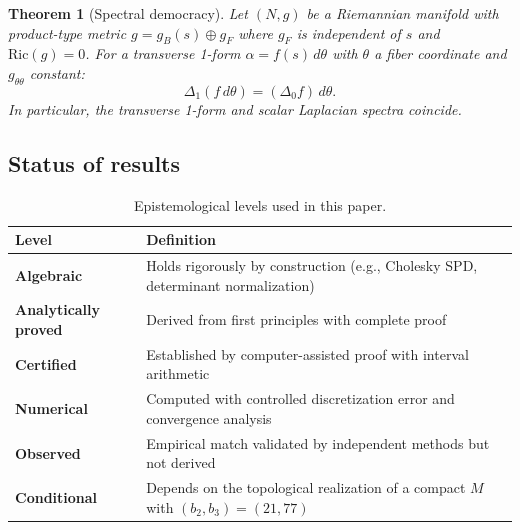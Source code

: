 \documentclass[11pt,a4paper]{article}
\newtheorem{theorem}{Theorem}[section]
\theoremstyle{definition}
\theoremstyle{remark}
\begin{document}
\begin{theorem}[Spectral democracy]\label{thm:D}
Let $(N, g)$ be a Riemannian manifold with product-type metric $g = g_B(s) \oplus g_F$ where $g_F$ is independent of $s$ and $\mathrm{Ric}(g) = 0$. For a transverse 1-form $\alpha = f(s)\,d\theta$ with $\theta$ a fiber coordinate and $g_{\theta\theta}$ constant:
\[
\Delta_1(f\, d\theta) = (\Delta_0 f)\, d\theta.
\]
In particular, the transverse 1-form and scalar Laplacian spectra coincide.
\end{theorem}

\subsection{Status of results}

\begin{table}[ht]
\centering
\begin{tabular}{ll}
\toprule
Level & Definition \\
\midrule
\textbf{Algebraic} & Holds rigorously by construction (e.g., Cholesky SPD, determinant normalization) \\
\textbf{Analytically proved} & Derived from first principles with complete proof \\
\textbf{Certified} & Established by computer-assisted proof with interval arithmetic \\
\textbf{Numerical} & Computed with controlled discretization error and convergence analysis \\
\textbf{Observed} & Empirical match validated by independent methods but not derived \\
\textbf{Conditional} & Depends on the topological realization of a compact $M$ with $(b_2, b_3) = (21,77)$ \\
\bottomrule
\end{tabular}
\caption{Epistemological levels used in this paper.}
\end{table}
\end{document}
